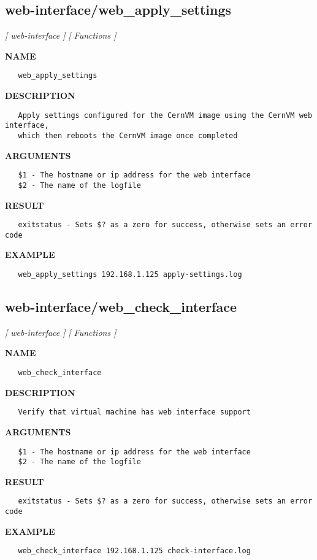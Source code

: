 \subsection{web-interface/web\_apply\_settings}
\textsl{[ web-interface ]}
\textsl{[ Functions ]}

\label{ch:robo61}
\label{ch:web_interface_web_apply_settings}
\textbf{NAME}
\begin{verbatim}
   web_apply_settings
\end{verbatim}
\textbf{DESCRIPTION}
\begin{verbatim}
   Apply settings configured for the CernVM image using the CernVM web interface, 
   which then reboots the CernVM image once completed
\end{verbatim}
\textbf{ARGUMENTS}
\begin{verbatim}
   $1 - The hostname or ip address for the web interface
   $2 - The name of the logfile
\end{verbatim}
\textbf{RESULT}
\begin{verbatim}
   exitstatus - Sets $? as a zero for success, otherwise sets an error code
\end{verbatim}
\textbf{EXAMPLE}
\begin{verbatim}
   web_apply_settings 192.168.1.125 apply-settings.log
\end{verbatim}
\newpage
\subsection{web-interface/web\_check\_interface}
\textsl{[ web-interface ]}
\textsl{[ Functions ]}

\label{ch:robo62}
\label{ch:web_interface_web_check_interface}
\textbf{NAME}
\begin{verbatim}
   web_check_interface
\end{verbatim}
\textbf{DESCRIPTION}
\begin{verbatim}
   Verify that virtual machine has web interface support
\end{verbatim}
\textbf{ARGUMENTS}
\begin{verbatim}
   $1 - The hostname or ip address for the web interface
   $2 - The name of the logfile
\end{verbatim}
\textbf{RESULT}
\begin{verbatim}
   exitstatus - Sets $? as a zero for success, otherwise sets an error code
\end{verbatim}
\textbf{EXAMPLE}
\begin{verbatim}
   web_check_interface 192.168.1.125 check-interface.log
\end{verbatim}
\newpage
